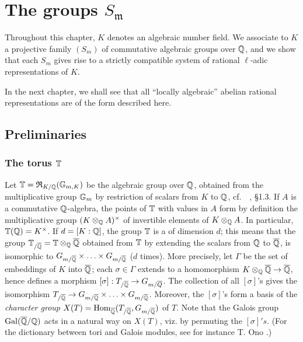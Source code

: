 \chapter{The groups \texorpdfstring{$S_{\mathfrak{m}}$}{Sm}}
\label{ch:ii}

Throughout this chapter,
\dpage
$K$ denotes an algebraic number field.
We associate to $K$ a projective family $(S_m)$ of commutative 
algebraic groups over $\mathbb{Q}$, and we show that each $S_m$ gives rise to a
strictly compatible system of rational $\ell$-adic representations of $K$.

In the next chapter, we shall see that all ``locally algebraic''
abelian rational representations are of the form described here.

\section{Preliminaries}

\subsection{The torus $\mathbb{T}$}
\label{sec:II_11}
Let $\mathbb{T} = \operatorname{\mathfrak{R}}_{K/\mathbb{Q}}(\mathbb{G}_{m, K})$
be the algebraic group over $\mathbb{Q}$, obtained from the multiplicative group
$\mathbb{G}_m$ by restriction of scalars from $K$ to $\mathbb{Q}$, cf.\ 
\citeauthor{43}~\cite{43}, \S 1.3. If $A$ is a commutative $\mathbb{Q}$-algebra, the
points of $\mathbb{T}$ with values in $A$ form by definition the multiplicative group
$(K \otimes_{\mathbb{Q}} A)^\times$ of invertible elements of $K \otimes_{\mathbb{Q}} A$.
In particular, $\mathbb{T}(\mathbb{Q}) = K^\times$. If $d = [K : \mathbb{Q}]$, the group $\mathbb{T}$ is a
\strong{torus}\index{Torus} of dimension $d$; this means that the group
$\mathbb{T}_{/\overline{\mathbb{Q}}} = \mathbb{T} \otimes_{\mathbb{Q}} \overline{\mathbb{Q}}$ obtained from $\mathbb{T}$ by extending
the scalars from $\mathbb{Q}$ to $\overline{\mathbb{Q}}$, is isomorphic
\dpage
to $G_{m/\overline{\mathbb{Q}}} \times \hdots \times G_{m/\overline{\mathbb{Q}}}$ ($d$ times). More 
precisely, let $\Gamma$ be the set of embeddings of $K$ into $\overline{\mathbb{Q}}$; each 
$\sigma \in \Gamma$ extends to a homomorphism $K \otimes_{\mathbb{Q}} \overline{\mathbb{Q}} \to 
\overline{\mathbb{Q}}$, hence defines a morphism $[\sigma] : T_{/\overline{\mathbb{Q}}} \to G_{m/
\overline{Q}}$. The collection of all $[\sigma]$'s gives the isomorphism $T_{/
\overline{\mathbb{Q}}} \to G_{m/\overline{\mathbb{Q}}} \times \hdots \times G_{m/\overline{\mathbb{Q}}}$. 
Moreover, the $[\sigma]$'s form a basis of the \emph{character group} $X(T) = 
\operatorname{Hom}_{\overline{\mathbb{Q}}} (T_{/\overline{\mathbb{Q}}} , G_{m/\overline{\mathbb{Q}}})$ of $T$. Note that the 
Galois group $\operatorname{Gal}(\overline{\mathbb{Q}} / \mathbb{Q})$ acts in a natural way on $X(T)$, viz. by 
permuting the $[\sigma]'s$. (For the dictionary between tori and Galois 
modules, see for instance T. Ono \cite{21}.)

